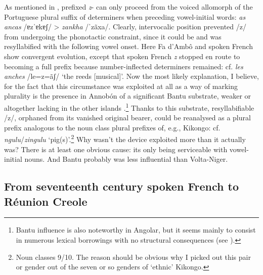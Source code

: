 \documentclass[output=paper]{langscibook}
\begin{document}
As mentioned in , prefixed \textit{z}{}- can only proceed from the voiced allomorph of the Portuguese plural suffix of determiners when preceding vowel-initial words: \textit{as ancas} /ɐzˈɐkɐʃ/ > \textit{zankha} /ˈzãxa/. Clearly, intervocalic position prevented /z/ from undergoing the phonotactic constraint, since it could be and was resyllabified with the following vowel onset. Here Fa d’Ambô and spoken French show convergent evolution, except that spoken French \textit{z} stopped en route to becoming a full prefix because number-inflected determiners remained: cf. \textit{les anches} /le=z=ãʃ/ ‘the reeds [musical]’. Now the most likely explanation, I believe, for the fact that this circumstance was exploited at all as a way of marking plurality is the presence in Annobón of a significant Bantu substrate, weaker or altogether lacking in the other islands \citep{Ferraz1984}.\footnote{Bantu influence is also noteworthy in Angolar, but it seems mainly to consist in numerous lexical borrowings with no structural consequences (see \citealt{Maurer2013}).} Thanks to this substrate, resyllabifiable /z/, orphaned from its vanished original bearer, could be reanalysed as a plural prefix analogous to the noun class plural prefixes of, e.g., Kikongo: cf. \textit{ngulu}\slash\textit{zingulu} ‘pig(s)’.\footnote{Noun classes 9/10. The reason should be obvious why I picked out this pair or gender out of the seven or so genders of ‘ethnic’ Kikongo.}  Why wasn’t the device exploited more than it actually was? There is at least one obvious cause: its only being serviceable with vowel-initial nouns. And Bantu probably was less influential than Volta-Niger.

\subsection{From seventeenth century spoken French to Réunion Creole}
\label{sec:kihm:5.3}
\end{document}
